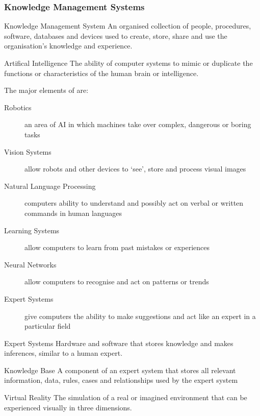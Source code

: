 \documentclass[\main/notes.tex]{subfiles}
\begin{document}
				\subsubsection{Knowledge Management Systems}
					\begin{definition}{Knowledge Management System}
						An organised collection of people, procedures, software, databases and devices used to create, store, share and use the organisation's knowledge and experience.
					\end{definition}
					\begin{definition}{Artifical Intelligence}
						The ability of computer systems to mimic or duplicate the functions or characteristics of the human brain or intelligence.
					\end{definition}
					The major elements of  are:
					\begin{indentparagraph}
						\begin{description}
							\item[Robotics] an area of AI in which machines take over complex, dangerous or boring tasks
							\item[Vision Systems] allow robots and other devices to `see', store and process visual images
							\item[Natural Language Processing] computers ability to understand and possibly act on verbal or written commands in human languages
							\item[Learning Systems] allow computers to learn from past mistakes or experiences
							\item[Neural Networks] allow computers to recognise and act on patterns or trends
							\item[Expert Systems] give computers the ability to make suggestions and act like an expert in a particular field 
						\end{description}
					\end{indentparagraph}
					\begin{definition}{Expert Systems}
						Hardware and software that stores knowledge and makes inferences, similar to a human expert.
					\end{definition}
					\begin{definition}{Knowledge Base}
						A component of an expert system that stores all relevant information, data, rules, cases and relationships used by the expert system
					\end{definition}
					\begin{definition}{Virtual Reality}
						The simulation of a real or imagined environment that can be experienced visually in three dimensions.
					\end{definition}
			\pagebreak
\end{document}
